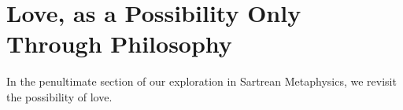 \chapter{Love, as a Possibility Only Through Philosophy}

In the penultimate section of our exploration in Sartrean Metaphysics, we revisit the possibility of love.